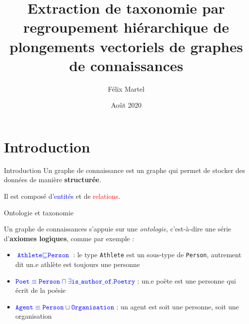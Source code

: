 \documentclass{beamer}
\title{Extraction de taxonomie par regroupement hiérarchique de plongements vectoriels de graphes de connaissances}
\author{Félix Martel}
\institute{Polytechnique Montréal}
\date{Août 2020}
\begin{document}
\frame{\titlepage}

  

\section{Introduction}

\iffalse {

Introduction : graphes de connaissance, intérêt de l'extraction de taxonomies
Modèles de plongement
- présentation simple
- exemple de TransE ?
- ajouter slides finales pour autres modèles

Extraction non-expressive
- Idée générale
- Méthode MLI
- Méthode MLM
- Évaluation & discussion

Extraction expressive
- Limites de l'approche précédente
- Idée générale
- Plongement-regroupement
- Extraction d'axiomes
- Évaluation quanti
- Évaluation quali

}
\fi

\begin{frame}{Introduction}
    Un graphe de connaissance est un graphe qui permet de stocker des données de manière \textbf{structurée}.

    \newline
    Il est composé d'\textcolor{blue}{entités} et de \textcolor{red}{relations}.

    \begin{figure}[H]
        \centering
        
    \end{figure}
    
\end{frame}


\begin{frame}{Ontologie et taxonomie}

Un graphe de connaissances s'appuie sur une \textit{ontologie}, c'est-à-dire une série d'\textbf{axiomes logiques}, comme par exemple :
\begin{itemize}
    \item \textcolor{blue}{$\texttt{Athlete} \sqsubseteq \texttt{Person}$} : le type \texttt{Athlete} est un sous-type de \texttt{Person}, autrement dit un.e athlète est toujours une personne
    \item \textcolor{blue}{$\texttt{Poet} \equiv \texttt{Person} \sqcap \exists \texttt{is\_author\_of}.\texttt{Poetry}$} : un.e poète est une personne qui écrit de la poésie
    \item \textcolor{blue}{$\texttt{Agent} \equiv \texttt{Person} \sqcup \texttt{Organisation}$} : un agent est soit une personne, soit une organisation
    
\end{itemize}
\end{frame}
\end{document}
